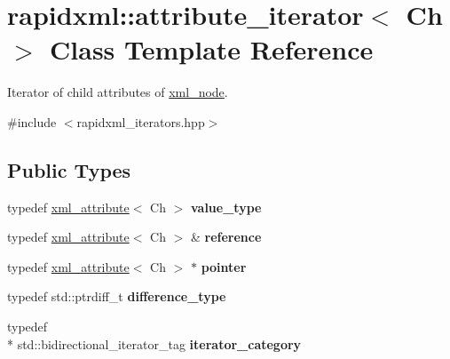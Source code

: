 \hypertarget{classrapidxml_1_1attribute__iterator}{\section{rapidxml\-:\-:attribute\-\_\-iterator$<$ Ch $>$ Class Template Reference}
\label{classrapidxml_1_1attribute__iterator}
}


Iterator of child attributes of \hyperlink{classrapidxml_1_1xml__node}{xml\-\_\-node}.  




{\ttfamily \#include $<$rapidxml\-\_\-iterators.\-hpp$>$}

\subsection*{Public Types}
\begin{DoxyCompactItemize}
\item 
\hypertarget{classrapidxml_1_1attribute__iterator_ad4280d358828ad9c3eb1a787decb162e}{typedef \hyperlink{classrapidxml_1_1xml__attribute}{xml\-\_\-attribute}$<$ Ch $>$ {\bfseries value\-\_\-type}}\label{classrapidxml_1_1attribute__iterator_ad4280d358828ad9c3eb1a787decb162e}

\item 
\hypertarget{classrapidxml_1_1attribute__iterator_a097343e44557de14de86b470d3f917d9}{typedef \hyperlink{classrapidxml_1_1xml__attribute}{xml\-\_\-attribute}$<$ Ch $>$ \& {\bfseries reference}}\label{classrapidxml_1_1attribute__iterator_a097343e44557de14de86b470d3f917d9}

\item 
\hypertarget{classrapidxml_1_1attribute__iterator_a69acc2e60270d6a062c03c9cb1cf2aa7}{typedef \hyperlink{classrapidxml_1_1xml__attribute}{xml\-\_\-attribute}$<$ Ch $>$ $\ast$ {\bfseries pointer}}\label{classrapidxml_1_1attribute__iterator_a69acc2e60270d6a062c03c9cb1cf2aa7}

\item 
\hypertarget{classrapidxml_1_1attribute__iterator_accfd6d8527d32b427496b42f71a2e37a}{typedef std\-::ptrdiff\-\_\-t {\bfseries difference\-\_\-type}}\label{classrapidxml_1_1attribute__iterator_accfd6d8527d32b427496b42f71a2e37a}

\item 
\hypertarget{classrapidxml_1_1attribute__iterator_a97ac5d8b98f5b03c68cc566f5ac0a9e0}{typedef \\*
std\-::bidirectional\-\_\-iterator\-\_\-tag {\bfseries iterator\-\_\-category}}\label{classrapidxml_1_1attribute__iterator_a97ac5d8b98f5b03c68cc566f5ac0a9e0}

\end{DoxyCompactItemize}
